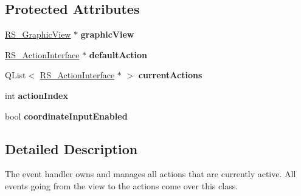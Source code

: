 \subsection*{Protected Attributes}
\begin{DoxyCompactItemize}
\item 
\hypertarget{classRS__EventHandler_a71c5cf4758663d1b3fe1dec8d6c9ad7f}{\hyperlink{classRS__GraphicView}{R\-S\-\_\-\-Graphic\-View} $\ast$ {\bfseries graphic\-View}}\label{classRS__EventHandler_a71c5cf4758663d1b3fe1dec8d6c9ad7f}

\item 
\hypertarget{classRS__EventHandler_aed5905023c439632508f2683931e5084}{\hyperlink{classRS__ActionInterface}{R\-S\-\_\-\-Action\-Interface} $\ast$ {\bfseries default\-Action}}\label{classRS__EventHandler_aed5905023c439632508f2683931e5084}

\item 
\hypertarget{classRS__EventHandler_a40364458ae5d10da2647ac6bf7611df5}{Q\-List$<$ \hyperlink{classRS__ActionInterface}{R\-S\-\_\-\-Action\-Interface} $\ast$ $>$ {\bfseries current\-Actions}}\label{classRS__EventHandler_a40364458ae5d10da2647ac6bf7611df5}

\item 
\hypertarget{classRS__EventHandler_a4bffca11ac0c4562d366b76d9a1a16a3}{int {\bfseries action\-Index}}\label{classRS__EventHandler_a4bffca11ac0c4562d366b76d9a1a16a3}

\item 
\hypertarget{classRS__EventHandler_af1bb1d1103fc7b0d0b821b43b5d0dab6}{bool {\bfseries coordinate\-Input\-Enabled}}\label{classRS__EventHandler_af1bb1d1103fc7b0d0b821b43b5d0dab6}

\end{DoxyCompactItemize}


\subsection{Detailed Description}
The event handler owns and manages all actions that are currently active. All events going from the view to the actions come over this class. 

